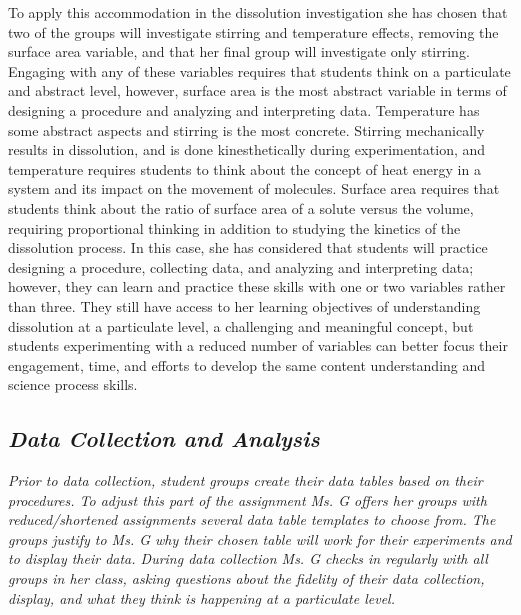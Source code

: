 \documentclass[11pt]{sig-alternate}
\begin{document}
\begin{large}
To apply this accommodation in the dissolution investigation she has chosen that two of the groups will investigate stirring and temperature effects, removing the surface area variable, and that her final group will investigate only stirring. Engaging with any of these variables requires that students think on a particulate and abstract level, however, surface area is the most abstract variable in terms of designing a procedure and analyzing and interpreting data. Temperature has some abstract aspects and stirring is the most concrete. Stirring mechanically results in dissolution, and is done kinesthetically during experimentation, and temperature requires students to think about the concept of heat energy in a system and its impact on the movement of molecules. Surface area requires that students think about the ratio of surface area of a solute versus the volume, requiring proportional thinking in addition to studying the kinetics of the dissolution process. In this case, she has considered that students will practice designing a procedure, collecting data, and analyzing and interpreting data; however, they can learn and practice these skills with one or two variables rather than three. They still have access to her learning objectives of understanding dissolution at a particulate level, a challenging and meaningful concept, but students experimenting with a reduced number of variables can better focus their engagement, time, and efforts to develop the same content understanding and science process skills.

\subsection*{\textit{\textbf{Data Collection and Analysis}}}

\textit{Prior to data collection, student groups create their data tables based on their procedures. To adjust this part of the assignment Ms. G offers her groups with reduced/shortened assignments several data table templates to choose from. The groups justify to Ms. G why their chosen table will work for their experiments and to display their data. During data collection Ms. G checks in regularly with all groups in her class, asking questions about the fidelity of their data collection, display, and what they think is happening at a particulate level.}


\end{large}
\end{document}
